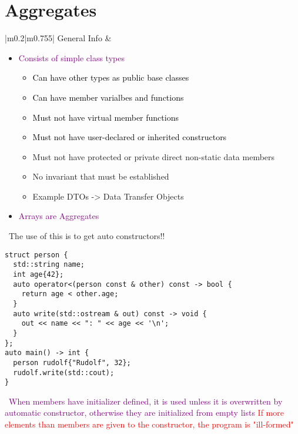 \documentclass[main.tex,fontsize=8pt,paper=a4,paper=portrait,DIV=calc,]{scrartcl}
\begin{document}
\begin{table}[ht!]
\section{Aggregates}
\begin{tabular}{|m{0.2\linewidth}|m{0.755\linewidth}|}
\hline
General Info &
\begin{itemize}
\item \textcolor{purple}{Consists of simple class types}\newline
  \begin{itemize}
  \item \textcolor{black}{Can have other types as public base classes}
  \item \textcolor{black}{Can have member varialbes and functions}
  \item \textcolor{black}{Must not have virtual member functions}
  \item \textcolor{black}{Must not have user-declared or inherited constructors}
  \item Must not have protected or private direct non-static data members
  \item No invariant that must be established
  \item Example DTOs -> Data Transfer Objects
  \end{itemize} 
\item \textcolor{purple}{Arrays are Aggregates}
\vspace{-3mm}
\end{itemize}
\, \newline
The use of this is to get auto constructors!! \newline
\begin{lstlisting}
struct person {
  std::string name;
  int age{42};
  auto operator<(person const & other) const -> bool {
    return age < other.age;
  }
  auto write(std::ostream & out) const -> void {
    out << name << ": " << age << '\n';
  }
};
auto main() -> int {
  person rudolf{"Rudolf", 32};
  rudolf.write(std::cout);
}
\end{lstlisting}
\, \newline
\textcolor{purple}{When members have initializer defined, it is used unless it is overwritten by automatic constructor, otherwise they are initialized from empty lists}\newline
\textcolor{red}{If more elements than members are given to the constructor, the program is "ill-formed"}\\
\hline
\end{tabular}
\end{table}
\end{document}
